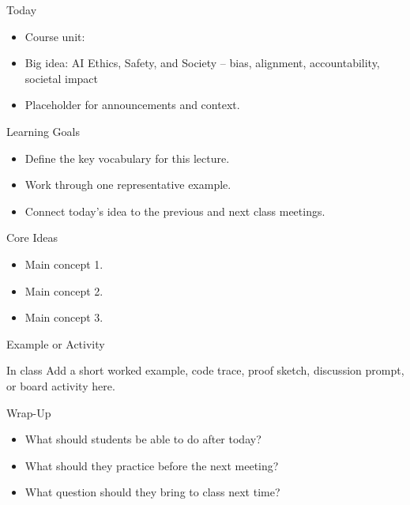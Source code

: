 \documentclass[aspectratio=169]{beamer}
\begin{document}
\makedecktitle

\begin{frame}{Today}
  \begin{itemize}
    \item Course unit: \CourseUnit
    \item Big idea: AI Ethics, Safety, and Society -- bias, alignment, accountability, societal impact
    \item Placeholder for announcements and context.
  \end{itemize}
\end{frame}

\begin{frame}{Learning Goals}
  \begin{itemize}
    \item Define the key vocabulary for this lecture.
    \item Work through one representative example.
    \item Connect today's idea to the previous and next class meetings.
  \end{itemize}
\end{frame}

\begin{frame}{Core Ideas}
  \placeholdernote
  \begin{itemize}
    \item Main concept 1.
    \item Main concept 2.
    \item Main concept 3.
  \end{itemize}
\end{frame}

\begin{frame}{Example or Activity}
  \begin{block}{In class}
    Add a short worked example, code trace, proof sketch, discussion prompt, or board activity here.
  \end{block}
\end{frame}

\begin{frame}{Wrap-Up}
  \begin{itemize}
    \item What should students be able to do after today?
    \item What should they practice before the next meeting?
    \item What question should they bring to class next time?
  \end{itemize}
\end{frame}
\end{document}
